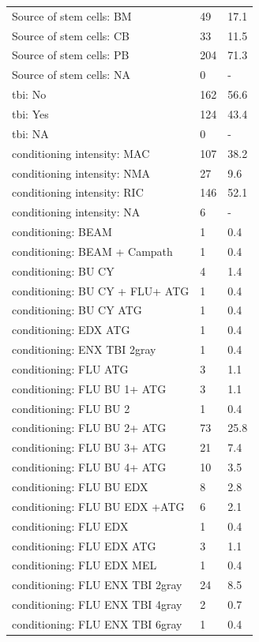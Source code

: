\documentclass[a4paper,11pt] {article}
\begin{document}
\begin{longtable}{lll}
  Source of stem cells: BM & 49 & 17.1 \\ 
  Source of stem cells: CB & 33 & 11.5 \\ 
  Source of stem cells: PB & 204 & 71.3 \\ 
  Source of stem cells: NA & 0 & - \\ 
  tbi: No & 162 & 56.6 \\ 
  tbi: Yes & 124 & 43.4 \\ 
  tbi: NA & 0 & - \\ 
  conditioning intensity: MAC & 107 & 38.2 \\ 
  conditioning intensity: NMA & 27 & 9.6 \\ 
  conditioning intensity: RIC & 146 & 52.1 \\ 
  conditioning intensity: NA & 6 & - \\ 
  conditioning: BEAM & 1 & 0.4 \\ 
  conditioning: BEAM + Campath & 1 & 0.4 \\ 
  conditioning: BU CY  & 4 & 1.4 \\ 
  conditioning: BU CY + FLU+ ATG & 1 & 0.4 \\ 
  conditioning: BU CY ATG & 1 & 0.4 \\ 
  conditioning: EDX ATG & 1 & 0.4 \\ 
  conditioning: ENX TBI 2gray & 1 & 0.4 \\ 
  conditioning: FLU ATG & 3 & 1.1 \\ 
  conditioning: FLU BU 1+ ATG & 3 & 1.1 \\ 
  conditioning: FLU BU 2 & 1 & 0.4 \\ 
  conditioning: FLU BU 2+ ATG & 73 & 25.8 \\ 
  conditioning: FLU BU 3+ ATG & 21 & 7.4 \\ 
  conditioning: FLU BU 4+ ATG & 10 & 3.5 \\ 
  conditioning: FLU BU EDX & 8 & 2.8 \\ 
  conditioning: FLU BU EDX +ATG & 6 & 2.1 \\ 
  conditioning: FLU EDX & 1 & 0.4 \\ 
  conditioning: FLU EDX ATG & 3 & 1.1 \\ 
  conditioning: FLU EDX MEL & 1 & 0.4 \\ 
  conditioning: FLU ENX TBI 2gray & 24 & 8.5 \\ 
  conditioning: FLU ENX TBI 4gray & 2 & 0.7 \\ 
  conditioning: FLU ENX TBI 6gray & 1 & 0.4 \\ 

\end{longtable}
\end{document}

